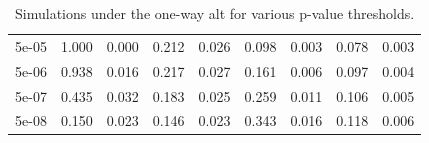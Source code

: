 \documentclass{article}
\begin{document}
\begin{table}[H]
\begin{tabular}{lrrrrrrrr}
\hspace{1em}5e-05 & 1.000 & 0.000 & 0.212 & 0.026 & 0.098 & 0.003 & 0.078 & 0.003\\
\hspace{1em}5e-06 & 0.938 & 0.016 & 0.217 & 0.027 & 0.161 & 0.006 & 0.097 & 0.004\\
\hspace{1em}5e-07 & 0.435 & 0.032 & 0.183 & 0.025 & 0.259 & 0.011 & 0.106 & 0.005\\
\hspace{1em}5e-08 & 0.150 & 0.023 & 0.146 & 0.023 & 0.343 & 0.016 & 0.118 & 0.006\\
\bottomrule
\end{tabular}
\caption{Simulations under the one-way alt for various p-value thresholds.}
\end{table}
\end{document}
